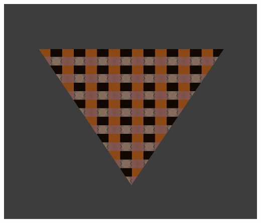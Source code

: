 \documentclass[letterpaper,11pt]{article}
\begin{document}
\includegraphics[scale = .6]{HW3_5.png}
\end{document}
